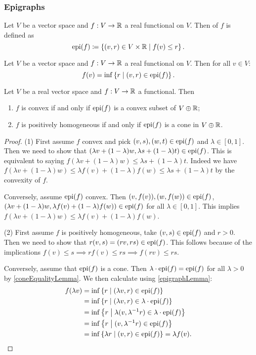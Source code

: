 \subsubsection{Epigraphs}
\begin{definition}
Let $V$ be a vector space and $f: V\to \mathbb{R}$ a real functional on $V$. Then  of $f$ is defined as
\[ \operatorname{epi}(f) \coloneqq \left\{ (v,r)\in V\times \mathbb{R} \;\middle|\; f(v)\leq r \right\}. \]
\end{definition}

\begin{lemma} \label{epigraphLemma}
Let $V$ be a vector space and $f: V\to \mathbb{R}$ a real functional on $V$. Then for all $v\in V$:
\[ f(v) = \inf\left\{ r \;\middle|\; (v,r)\in \operatorname{epi}(f) \right\}. \]
\end{lemma}

\begin{proposition}
Let $V$ be a real vector space and $f: V\to \mathbb{R}$ a functional. Then
\begin{enumerate}
\item $f$ is convex \textup{if and only if} $\operatorname{epi}(f)$ is a convex subset of $V\oplus \mathbb{R}$;
\item $f$ is positively homogeneous \textup{if and only if} $\operatorname{epi}(f)$ is a cone in $V\oplus \mathbb{R}$.
\end{enumerate}
\end{proposition}
\begin{proof}
(1) First assume $f$ convex and pick $(v, s), (w,t)\in \operatorname{epi}(f)$ and $\lambda\in [0,1]$. Then we need to show that $(\lambda v + (1-\lambda)w, \lambda s + (1-\lambda)t) \in \operatorname{epi}(f)$. This is equivalent to saying $f(\lambda v + (1-\lambda)w) \leq \lambda s + (1-\lambda)t$. Indeed we have $f(\lambda v + (1-\lambda)w) \leq \lambda f(v) + (1-\lambda)f(w) \leq \lambda s + (1-\lambda)t$ by the convexity of $f$.

Conversely, assume $\operatorname{epi}(f)$ convex. Then $(v, f(v)), (w,f(w))\in \operatorname{epi}(f)$, $(\lambda v + (1-\lambda)w, \lambda f(v) + (1-\lambda)f(w)) \in \operatorname{epi}(f)$ for all $\lambda\in [0,1]$. This implies $f(\lambda v + (1-\lambda)w) \leq \lambda f(v) + (1-\lambda)f(w)$.

(2) First assume $f$ is positively homogeneous, take $(v,s)\in \operatorname{epi}(f)$ and $r>0$. Then we need to show that $r(v,s) = (rv,rs)\in \operatorname{epi}(f)$. This follows because of the implications $f(v)\leq s \implies rf(v) \leq rs \implies f(rv) \leq rs$.

Conversely, assume that $\operatorname{epi}(f)$ is a cone. Then $\lambda\cdot \operatorname{epi}(f) = \operatorname{epi}(f)$ for all $\lambda>0$ by \ref{coneEqualityLemma}. We then calculate using \ref{epigraphLemma}:
\begin{align*}
f(\lambda v) &= \inf\left\{ r \;\middle|\; (\lambda v,r)\in \operatorname{epi}(f) \right\} \\
&= \inf\left\{ r \;\middle|\; (\lambda v,r)\in \lambda\cdot\operatorname{epi}(f) \right\} \\
&= \inf\left\{ r \;\middle|\; \lambda(v,\lambda^{-1}r)\in \lambda\cdot\operatorname{epi}(f) \right\} \\
&= \inf\left\{ r \;\middle|\; (v,\lambda^{-1}r)\in \operatorname{epi}(f) \right\} \\
&= \inf\left\{ \lambda r \;\middle|\; (v,r)\in \operatorname{epi}(f) \right\} = \lambda f(v).
\end{align*} 
\end{proof}
